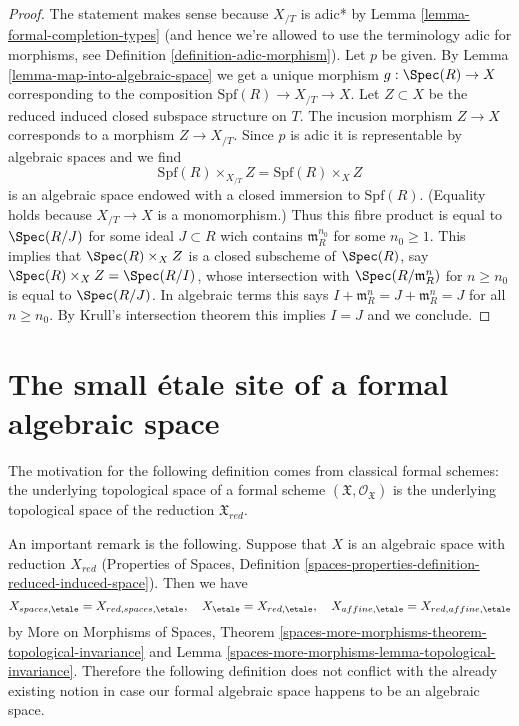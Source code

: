 \begin{proof}
The statement makes sense because $X_{/T}$ is adic* by
Lemma \ref{lemma-formal-completion-types} (and hence we're
allowed to use the terminology adic for morphisms, see
Definition \ref{definition-adic-morphism}).
Let $p$ be given. By Lemma \ref{lemma-map-into-algebraic-space}
we get a unique morphism $g : \Spec(R) \to X$ corresponding to
the composition $\text{Spf}(R) \to X_{/T} \to X$.
Let $Z \subset X$ be the reduced induced closed subspace structure
on $T$. The incusion morphism $Z \to X$ corresponds to a morphism
$Z \to X_{/T}$. Since $p$ is adic it is representable by algebraic
spaces and we find
$$
\text{Spf}(R) \times_{X_{/T}} Z = \text{Spf}(R) \times_X Z
$$
is an algebraic space endowed with a closed immersion to $\text{Spf}(R)$.
(Equality holds because $X_{/T} \to X$ is a monomorphism.)
Thus this fibre product is equal to $\Spec(R/J)$ for some
ideal $J \subset R$ wich contains $\mathfrak m_R^{n_0}$ for some
$n_0 \geq 1$. This implies that $\Spec(R) \times_X Z$
is a closed subscheme of $\Spec(R)$,
say $\Spec(R) \times_X Z = \Spec(R/I)$, whose intersection with
$\Spec(R/\mathfrak m_R^n)$ for $n \geq n_0$ is equal to $\Spec(R/J)$.
In algebraic terms this says
$I + \mathfrak m_R^n = J + \mathfrak m_R^n = J$ for all $n \geq n_0$.
By Krull's intersection theorem
this implies $I = J$ and we conclude.
\end{proof}








\section{The small \'etale site of a formal algebraic space}
\label{section-etale-sites}

\noindent
The motivation for the following definition comes from classical
formal schemes: the underlying topological space of a formal scheme
$(\mathfrak X, \mathcal{O}_\mathfrak X)$
is the underlying topological space of the reduction $\mathfrak X_{red}$.

\medskip\noindent
An important remark is the following. Suppose that $X$ is an algebraic space
with reduction $X_{red}$ (Properties of Spaces, Definition
\ref{spaces-properties-definition-reduced-induced-space}).
Then we have
$$
X_{spaces, \etale} = X_{red, spaces, \etale},\quad
X_\etale = X_{red, \etale},\quad
X_{affine, \etale} = X_{red, affine, \etale}
$$
by More on Morphisms of Spaces, Theorem
\ref{spaces-more-morphisms-theorem-topological-invariance} and
Lemma \ref{spaces-more-morphisms-lemma-topological-invariance}.
Therefore the following definition does not conflict with the already
existing notion in case our formal algebraic space happens to be
an algebraic space.

